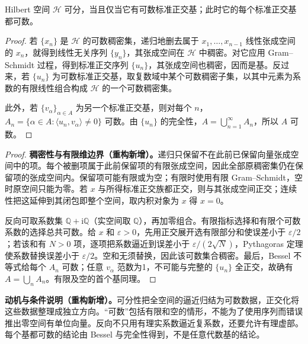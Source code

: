 \documentclass[../../main.tex]{subfiles}
\begin{document}
\begin{proposition}\label{proposition:ch05-separable-orthonormal-basis}
Hilbert 空间 $\mathscr H$ 可分，当且仅当它有可数标准正交基；此时它的每个标准正交基都可数。
\end{proposition}
\begin{proof}
若 $\{x_n\}$ 是 $\mathscr H$ 的可数稠密集，递归地删去属于 $x_1,\ldots,x_{n-1}$ 线性张成空间的 $x_n$，就得到线性无关序列 $\{y_n\}$，其张成空间在 $\mathscr H$ 中稠密。对它应用 Gram--Schmidt 过程，得到标准正交序列 $\{u_n\}$，其张成空间也稠密，因而是基。反过来，若 $\{u_n\}$ 为可数标准正交基，取复数域中某个可数稠密子集，以其中元素为系数的有限线性组合构成 $\mathscr H$ 的一个可数稠密集。

此外，若 $\{v_\alpha\}_{\alpha\in A}$ 为另一个标准正交基，则对每个 $n$，$A_n=\{\alpha\in A:\langle u_n,v_\alpha\rangle\ne0\}$ 可数。由 $\{u_n\}$ 的完全性，$A=\bigcup_{n=1}^{\infty}A_n$，所以 $A$ 可数。
\end{proof}
\begin{proof}
\textbf{稠密性与有限维边界（重构新增）。}递归只保留不在此前已保留向量张成空间中的项。每个被删项属于此前保留项的有限张成空间，因此全部原稠密集仍在保留项的张成空间内。保留项可能有限或为空；有限时使用有限 Gram--Schmidt，空时原空间只能为零。若 $x$ 与所得标准正交族都正交，则与其张成空间正交；连续性把这延伸到其闭包即整个空间，取内积对象为 $x$ 得 $x=0$。

反向可取系数集 $\mathbb Q+\mathrm i\mathbb Q$（实空间取 $\mathbb Q$），再加零组合。有限指标选择和有限个可数系数的选择总共可数。给 $x$ 和 $\varepsilon>0$，先用正交展开选有限部分和使误差小于 $\varepsilon/2$；若该和有 $N>0$ 项，逐项把系数逼近到误差小于 $\varepsilon/(2\sqrt N)$，Pythagoras 定理使系数替换误差小于 $\varepsilon/2$。空和无须替换，因此该可数集合稠密。最后，Bessel 不等式给每个 $A_n$ 可数；任意 $v_\alpha$ 范数为1，不可能与完整的 $\{u_n\}$ 全正交，故确有 $A=\bigcup_nA_n$。有限及空的首个基同理。
\end{proof}
\begin{remark}
\textbf{动机与条件说明（重构新增）。}可分性把全空间的逼近归结为可数数据，正交化将这些数据整理成独立方向。“可数”包括有限和空的情形，不能为了使用序列而错误推出零空间有单位向量。反向不只用有理实系数逼近复系数，还要允许有理虚部。每个基都可数的结论由 Bessel 与完全性得到，不是任意代数基的结论。
\end{remark}
\end{document}
